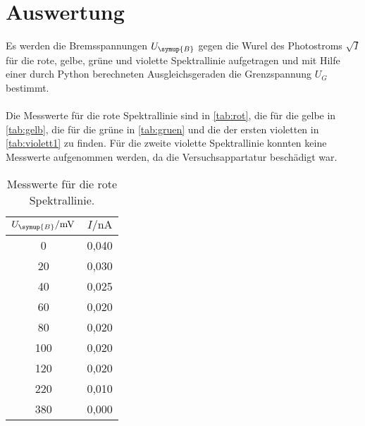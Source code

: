 \section{Auswertung}
\label{sec:Auswertung}
Es werden die Bremsspannungen $U_{\symup{B}}$ gegen die Wurel des Photostroms $\sqrt{I}$ für die
rote, gelbe, grüne und violette Spektrallinie aufgetragen und mit Hilfe einer durch
Python berechneten Ausgleichsgeraden die Grenzspannung $U_G$ bestimmt.\\
\\
Die Messwerte für die rote Spektrallinie sind in \autoref{tab:rot}, die für die gelbe in \autoref{tab:gelb},
die für die grüne in \autoref{tab:gruen} und die der ersten violetten in \autoref{tab:violett1} zu finden.
Für die zweite violette Spektrallinie konnten keine Messwerte aufgenommen werden, da die Versuchsappartatur
beschädigt war.
\begin{table}[!hbt]
    \centering
    \caption{Messwerte für die rote Spektrallinie.}
    \label{tab:rot}
    \begin{tabular}{c c}
        \toprule
        $U_{\symup{B}} / \unit{\milli\volt}$ & $I / \unit{\nano\ampere}$ \\
        \midrule
          0 & 0,040 \\
         20 & 0,030 \\
         40 & 0,025 \\
         60 & 0,020 \\
         80 & 0,020 \\
        100 & 0,020 \\
        120 & 0,020 \\
        220 & 0,010 \\
        380 & 0,000 \\
        \bottomrule
    \end{tabular}
\end{table}

